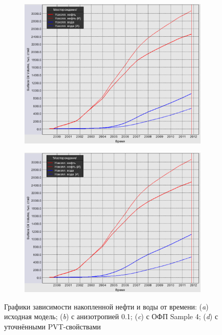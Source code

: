 \documentclass[a4paper,12pt]{article}
\begin{document}
\begin{figure}[H]
\begin{subfigure}[t]{\dimexpr.5\linewidth-1.3em\relax}
	\centering
	\includegraphics[width=.95\linewidth]{nakop_ofp_model}
\end{subfigure}%
\hfill %
%
\begin{subfigure}[t]{\dimexpr.5\linewidth-1.3em\relax}
	\centering
	\includegraphics[width=.95\linewidth]{nakop_pvt_model}
\end{subfigure}
\captionsetup{justification=centering} %
\caption{Графики зависимости накопленной нефти и воды от времени: ({\itshape a}) исходная модель; ({\itshape b}) с анизотропией 0.1; ({\itshape c}) с ОФП Sample 4; ({\itshape d}) с уточнёнными PVT-свойствами} 
\label{fig:nakop_variations}
\end{figure}
\end{document}
